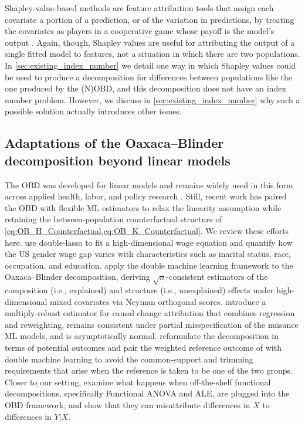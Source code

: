 Shapley-value-based methods are feature attribution tools that assign each covariate a portion of a prediction, or of the variation in predictions, by treating the covariates as players in a cooperative game whose payoff is the model's output \citep{Shapley1953, Lundberg2017, chen2025shapley}.
Again, though, Shapley values are useful for attributing the output of a single fitted model to features, not a situation in which there are two populations.
In \cref{sec:existing_index_number} we detail one way in which Shapley values could be used to produce a decomposition for differences between populations like the one produced by the (N)OBD, and this decomposition does not have an index number problem. However, we discuss in \cref{sec:existing_index_number} why such a possible solution actually introduces other issues.

\subsection{Adaptations of the Oaxaca--Blinder decomposition beyond linear models}
\label{appendix:obd_generalized}

The OBD was developed for linear models \citep{oaxaca1973, blinder1973} and remains widely used in this form across applied health, labor, and policy research \citep{paradaContzen2025, barhaim2023, cartwright2021}.
Still, recent work has paired the OBD with flexible ML estimators to relax the linearity assumption while retaining the between-population counterfactual structure of \cref{eq:OB_H_Counterfactual,eq:OB_K_Counterfactual}.
We review these efforts here.
\citet{bach2024heterogeneity} use double-lasso to fit a high-dimensional wage equation and quantify how the US gender wage gap varies with characteristics such as marital status, race, occupation, and education.
\citet{mao2025double} apply the double machine learning framework to the Oaxaca--Blinder decomposition, deriving $\sqrt{n}$-consistent estimators of the composition (i.e., explained) and structure (i.e., unexplained) effects under high-dimensional mixed covariates via Neyman orthogonal scores.
\citet{quintas2024multiply} introduce a multiply-robust estimator for causal change attribution that combines regression and reweighting, remains consistent under partial misspecification of the nuisance ML models, and is asymptotically normal.
\citet{flachaire2025decomposing} reformulate the decomposition in terms of potential outcomes and pair the weighted reference outcome of \citet{neumark1988} with double machine learning to avoid the common-support and trimming requirements that arise when the reference is taken to be one of the two groups.
Closer to our setting, \citet{quintero2025} examine what happens when off-the-shelf functional decompositions, specifically Functional ANOVA and ALE, are plugged into the OBD framework, and show that they can misattribute differences in $X$ to differences in $Y|X$.


